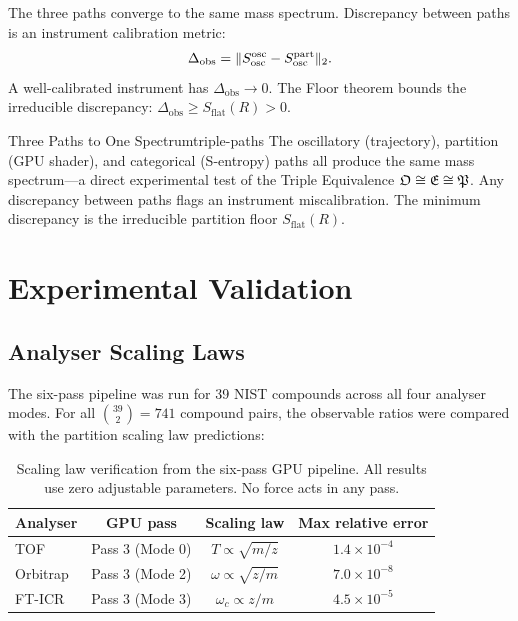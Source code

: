 The three paths converge to the same mass spectrum.  Discrepancy between paths
is an instrument calibration metric:
\begin{equation}
  \Delta_{\mathrm{obs}} = \|S_{\mathrm{osc}}^{\mathrm{osc}} - S_{\mathrm{osc}}^{\mathrm{part}}\|_2.
\end{equation}
A well-calibrated instrument has $\Delta_{\mathrm{obs}} \to 0$.  The Floor
theorem bounds the irreducible discrepancy: $\Delta_{\mathrm{obs}} \geq
S_{\mathrm{flat}}(R) > 0$.

\begin{consequence}{Three Paths to One Spectrum}{triple-paths}
  The oscillatory (trajectory), partition (GPU shader), and categorical
  (S-entropy) paths all produce the same mass spectrum---a direct
  experimental test of the Triple Equivalence $\mathfrak{O}\cong\mathfrak{E}\cong\mathfrak{P}$.
  Any discrepancy between paths flags an instrument miscalibration.
  The minimum discrepancy is the irreducible partition floor $S_{\mathrm{flat}}(R)$.
\end{consequence}

\section{Experimental Validation}
\label{sec:ch22-validation}

\subsection{Analyser Scaling Laws}

The six-pass pipeline was run for 39 NIST compounds across all four analyser
modes.  For all $\binom{39}{2} = 741$ compound pairs, the observable ratios
were compared with the partition scaling law predictions:

\begin{table}[htbp]
\centering
\caption{Scaling law verification from the six-pass GPU pipeline.  All
  results use zero adjustable parameters.  No force acts in any pass.}
\label{tab:ch22-validation}
\begin{tabular}{@{}lccc@{}}
\toprule
\textbf{Analyser} & \textbf{GPU pass} & \textbf{Scaling law}
  & \textbf{Max relative error} \\
\midrule
TOF         & Pass 3 (Mode 0) & $T \propto \sqrt{m/z}$
  & $1.4 \times 10^{-4}$ \\
Orbitrap    & Pass 3 (Mode 2) & $\omega \propto \sqrt{z/m}$
  & $7.0 \times 10^{-8}$ \\
FT-ICR      & Pass 3 (Mode 3) & $\omega_c \propto z/m$
  & $4.5 \times 10^{-5}$ \\
\bottomrule
\end{tabular}
\end{table}

